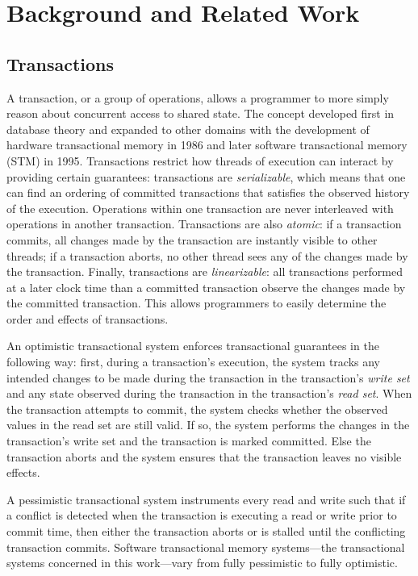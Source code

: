 \section{Background and Related Work}

\subsection{Transactions}
A transaction, or a group of operations, allows a programmer to more simply reason about concurrent access to shared state. The concept developed first in database theory and expanded to other domains with the development of hardware transactional memory in 1986 and later software transactional memory (STM) in 1995. Transactions restrict how threads of execution can interact by providing certain guarantees: transactions are \emph{serializable}, which means that one can find an ordering of committed transactions that satisfies the observed history of the execution. Operations within one transaction are never interleaved with operations in another transaction. Transactions are also \emph{atomic}: if a transaction commits, all changes made by the transaction are instantly visible to other threads; if a transaction aborts, no other thread sees any of the changes made by the transaction. Finally, transactions are \emph{linearizable}\cite{linearizability}: all transactions performed at a later clock time than a committed transaction observe the changes made by the committed transaction. This allows programmers to easily determine the order and effects of transactions.

An optimistic transactional system\cite{harristm} enforces transactional guarantees in the following way: first, during a transaction's execution, the system tracks any intended changes to be made during the transaction in the transaction's \emph{write set} and any state observed during the transaction in the transaction's \emph{read set}. When the transaction attempts to commit, the system checks whether the observed values in the read set are still valid. If so, the system performs the changes in the transaction's write set and the transaction is marked committed. Else the transaction aborts and the system ensures that the transaction leaves no visible effects.

A pessimistic transactional system instruments every read and write such that if a conflict is detected when the transaction is executing a read or write prior to commit time, then either the transaction aborts or is stalled until the conflicting transaction commits. Software transactional memory systems---the transactional systems concerned in this work---vary from fully pessimistic to fully optimistic.

